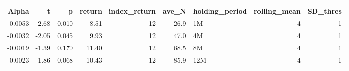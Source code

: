 \begin{table}[ht]
\centering
\begin{tabular}{rrrrrrlrr}
  \hline
Alpha & t & p & return & index\_return & ave\_N & holding\_period & rolling\_mean & SD\_thres \\ 
  \hline
-0.0053 & -2.68 & 0.010 & 8.51 & 12 & 26.9 & 1M &  4 &  1 \\ 
  -0.0032 & -2.05 & 0.045 & 9.93 & 12 & 47.0 & 4M &  4 &  1 \\ 
  -0.0019 & -1.39 & 0.170 & 11.40 & 12 & 68.5 & 8M &  4 &  1 \\ 
  -0.0023 & -1.86 & 0.068 & 10.43 & 12 & 85.9 & 12M &  4 &  1 \\ 
   \hline
\end{tabular}
\end{table}

